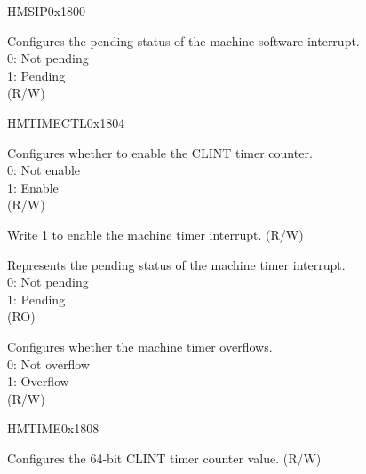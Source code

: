 
\begin{register}{H}{MSIP}{0x1800}\label{regdesc:CLINTMSIPREG}
%
%
\regnewline%
\begin{regdesc}
\begin{reglist}
\label{fielddesc:CLINTMSIP}\item[MSIP] Configures the pending status of the machine software interrupt.\\
0: Not pending\\
1: Pending\\
(R/W)
\end{reglist}
\end{regdesc}
\end{register}

\begin{register}{H}{MTIMECTL}{0x1804}\label{regdesc:CLINTMTIMECTLREG}
%
%
%
%
%
\regnewline%
\begin{regdesc}
\begin{reglist}
\label{fielddesc:CLINTMTIMECTLMTCE}\item [MTCE] Configures whether to enable the CLINT timer counter.\\
0: Not enable\\
1: Enable\\
(R/W)
\label{fielddesc:CLINTMTIMECTLMTIE}\item [MTIE] Write 1 to enable the machine timer interrupt. (R/W)
\label{fielddesc:CLINTMTIMECTLMTIP}\item [MTIP] Represents the pending status of the machine timer interrupt.\\
0: Not pending\\
1: Pending\\
(RO)
\label{fielddesc:CLINTMTIMECTLMTOF}\item [MTOF] Configures whether the machine timer overflows.\\
0: Not overflow\\
1: Overflow\\
(R/W)
\end{reglist}
\end{regdesc}
\end{register}

\begin{register}{H}{MTIME}{0x1808}\label{regdesc:CLINTMTIMEREG}
%
\regnewline%
%
\regnewline%
\begin{regdesc}
\begin{reglist}
\label{fielddesc:CLINTMTIME}\item [MTIME] Configures the 64-bit CLINT timer counter value. (R/W)
\end{reglist}
\end{regdesc}
\end{register}

